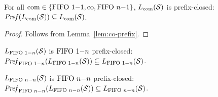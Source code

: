 \begin{proposition}
	For all $\textup{com} \in \{\text{FIFO } 1\mathsf{-}1, \text{co}, \text{FIFO } n\mathsf{-}1\}$, $L_{\textup{com}}(\mathcal{S})$ is prefix-closed:
	$\mathit{Pref}(L_{\textup{com}}(\mathcal{S})) \subseteq L_{\textup{com}}(\mathcal{S})$.
\end{proposition}
\begin{proof}
	Follows from Lemma~\ref{lem:co-prefix}.
\end{proof}

\begin{proposition}
	$L_{\text{FIFO } 1\mathsf{-}n}(\mathcal{S})$ is $\text{FIFO } 1\mathsf{-}n$ prefix-closed:
	$\mathit{Pref}_{\text{FIFO } 1\mathsf{-}n}(L_{\text{FIFO } 1\mathsf{-}n}(\mathcal{S})) \subseteq L_{\text{FIFO } 1\mathsf{-}n}(\mathcal{S})$.
\end{proposition}
\begin{proposition}
	$L_{\text{FIFO } n\mathsf{-}n}(\mathcal{S})$ is $\text{FIFO } n\mathsf{-}n$ prefix-closed:
	$\mathit{Pref}_{\text{FIFO } n\mathsf{-}n}(L_{\text{FIFO } n\mathsf{-}n}(\mathcal{S})) \subseteq L_{\text{FIFO } n\mathsf{-}n}(\mathcal{S})$.
\end{proposition}

\begin{comment}

Lemma~\ref{lem:prefix-closed} can be easily extendend to $\comsymb = \cosymb$.

\begin{lemma}\label{lem:co-prefix-closed}
	For all $\comsymb \in \{\ppsymb, \mbsymb, \cosymb\}$, $\cL{\Sys}$ is prefix-closed:
	$\Pref{\cL{\Sys}} \subseteq \cL{\Sys}$.
\end{lemma}
\begin{proof}
	Follows from Lemma~\ref{lem:co-prefix}.
\end{proof}

\begin{lemma}\label{lem:onen-prefix-closed}
	$\onenL{\Sys}$ is $\onen$ prefix-closed:
	$\Prefonen{\onenL{\Sys}} \subseteq \onenL{\Sys}$.
\end{lemma}
\begin{proof}
	Given a system $\System$, we have that $\onenL{\System} = \ppL{\System} \cap \onenMSCs$. Note that, because of how we defined a $\onen$ prefix, we have that $\Prefonen{\onenL{\Sys}} = \Pref{\onenL{\Sys}} \cap \onenMSCs$. Moreover, $\Pref{\onenL{\Sys}} \subseteq \Pref{\ppL{\Sys}}$, and $\Pref{\onenL{\Sys}} \subseteq \ppL{\Sys}$ for Lemma~\ref{lem:prefix-closed}. Putting everything together, $\Prefonen{\onenL{\Sys}} \subseteq \ppL{\Sys} \cap \onenMSCs = \onenL{\System}$.
\end{proof}

\begin{lemma}\label{lem:nn-prefix-closed}
	$\nnL{\Sys}$ is $\nn$ prefix-closed:
	$\Prefnn{\nnL{\Sys}} \subseteq \nnL{\Sys}$.
\end{lemma}
\begin{proof}
	Given a system $\System$, we have that $\nnL{\System} = \ppL{\System} \cap \nnMSCs$. Note that, because of how we defined a $\nn$ prefix, we have that $\Prefnn{\nnL{\Sys}} = \Pref{\nnL{\Sys}} \cap \nnMSCs$. Moreover, $\Pref{\nnL{\Sys}} \subseteq \Pref{\ppL{\Sys}}$, and $\Pref{\nnL{\Sys}} \subseteq \ppL{\Sys}$ for Lemma~\ref{lem:prefix-closed}. Putting everything together, $\Prefnn{\nnL{\Sys}} \subseteq \ppL{\Sys} \cap \nnMSCs = \nnL{\System}$.
\end{proof}

\end{comment}


